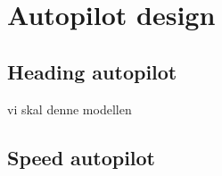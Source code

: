 \section{Autopilot design}\label{sec:prob1}

\subsection{Heading autopilot}
vi skal denne modellen


\subsection{Speed autopilot}

